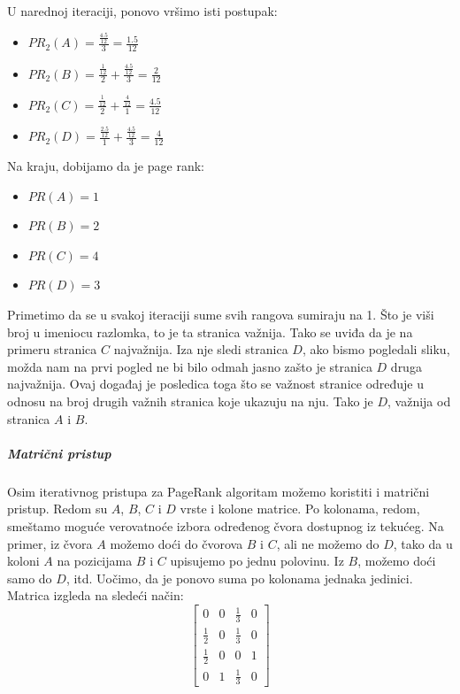 \documentclass[a4paper]{article}
\begin{document}
U narednoj iteraciji, ponovo vršimo isti postupak:
\begin{itemize}
\item $PR_2(A) = \frac{\frac{4.5}{12}}{3} = \frac{1.5}{12}$
\item $PR_2(B) = \frac{\frac{1}{12}}{2} + \frac{\frac{4.5}{12}}{3} = \frac{2}{12}$
\item $PR_2(C) = \frac{\frac{1}{12}}{2} + \frac{\frac{4}{12}}{1} = \frac{4.5}{12}$
\item $PR_2(D) = \frac{\frac{2.5}{12}}{1} + \frac{\frac{4.5}{12}}{3} = \frac{4}{12}$
\end{itemize}
Na kraju, dobijamo da je page rank:
\begin{itemize}
\item $PR(A) = 1$
\item $PR(B) = 2$
\item $PR(C) = 4$
\item $PR(D) = 3$
\end{itemize}
Primetimo da se u svakoj iteraciji sume svih rangova sumiraju na 1. Što je viši broj u imeniocu razlomka, to je ta stranica važnija. Tako se uviđa da je na primeru stranica $C$ najvažnija. Iza nje sledi stranica $D$, ako bismo pogledali sliku, možda nam na prvi pogled ne bi bilo odmah jasno zašto je stranica $D$ druga najvažnija. Ovaj događaj je posledica toga što se važnost stranice određuje u odnosu na broj drugih važnih stranica koje ukazuju na nju. Tako je $D$, važnija od stranica $A$ i $B$.\\
\subparagraph{Matrični pristup}
Osim iterativnog pristupa za PageRank algoritam možemo koristiti i matrični pristup. Redom su $A$, $B$, $C$ i $D$ vrste i kolone matrice. Po kolonama, redom, smeštamo moguće verovatnoće izbora određenog čvora dostupnog iz tekućeg. Na primer, iz čvora $A$ možemo doći do čvorova $B$ i $C$, ali ne možemo do $D$, tako da u koloni $A$ na pozicijama $B$ i $C$ upisujemo po jednu polovinu. Iz $B$, možemo doći samo do $D$, itd. Uočimo, da je ponovo suma po kolonama jednaka jedinici. Matrica izgleda na sledeći način:
\[
\begin{bmatrix}
    0           & 0 & \frac{1}{3} & 0\\
    \frac{1}{2} & 0 & \frac{1}{3} & 0\\
    \frac{1}{2} & 0 & 0           & 1\\
    0           & 1 & \frac{1}{3} & 0
\end{bmatrix}
\]
\end{document}
